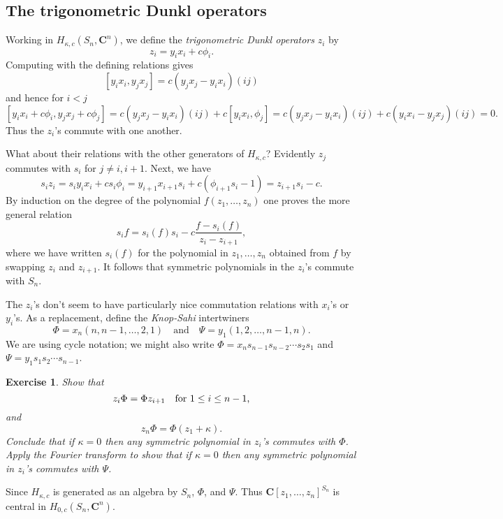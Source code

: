 \documentclass[12pt, reqno]{amsart}
\numberwithin{equation}{section}
\theoremstyle{definition}
\theoremstyle{plain}
\newtheorem{exercise}{Exercise}
\newcommand{\CC}{\mathbf{C}}
\begin{document}
 
\subsection{The trigonometric Dunkl operators} 

Working in $H_{\kappa,c}(S_n,\CC^n)$, we define the \emph{trigonometric Dunkl operators} $z_i$ by
$$z_i=y_i x_i+c \phi_i.$$ Computing with the defining relations gives
$$[y_i x_i,y_j x_j]=c(y_j x_j-y_i x_i) (ij)$$ and hence for $i<j$
$$[y_i x_i+c \phi_i,y_j x_j+c\phi_j]=c(y_j x_j-y_i x_i)(ij)+c[y_i x_i,\phi_j]=c(y_j x_j-y_i x_i)(ij)+c(y_i x_i-y_j x_j)(ij)=0.$$ Thus the $z_i$'s commute with one another. 

What about their relations with the other generators of $H_{\kappa,c}$? Evidently $z_j$ commutes with $s_i$ for $j \neq i,i+1$. Next, we have
$$s_i z_i=s_i y_i x_i+ c s_i \phi_i=y_{i+1} x_{i+1} s_i+c(\phi_{i+1}s_i-1)=z_{i+1} s_i-c.$$ By induction on the degree of the polynomial $f(z_1,\dots,z_n)$ one proves the more general relation
$$s_i f=s_i(f) s_i-c \frac{f-s_i(f)}{z_i-z_{i+1}},$$ where we have written $s_i(f)$ for the polynomial in $z_1,\dots,z_n$ obtained from $f$ by swapping $z_i$ and $z_{i+1}$. It follows that symmetric polynomials in the $z_i$'s commute with $S_n$. 

The $z_i$'s don't seem to have particularly nice commutation relations with $x_i$'s or $y_i$'s. As a replacement, define the \emph{Knop-Sahi} intertwiners $$\Phi=x_n (n,n-1,\dots,2,1) \quad \text{and} \quad \Psi=y_1 (1,2,\dots,n-1,n).$$ We are using cycle notation; we might also write $\Phi=x_n s_{n-1} s_{n-2} \cdots s_2 s_1$ and $\Psi=y_1 s_1 s_2 \cdots s_{n-1}$.
\begin{exercise}
Show that
$$z_i \Phi=\Phi z_{i+1} \quad \hbox{for $1 \leq i \leq n-1$,}$$ and
$$z_n \Phi=\Phi (z_1 +\kappa).$$	Conclude that if $\kappa=0$ then any symmetric polynomial in $z_i$'s commutes with $\Phi$. Apply the Fourier transform to show that if $\kappa=0$ then any symmetric polynomial in $z_i$'s commutes with $\Psi$.
\end{exercise}

Since $H_{\kappa,c}$ is generated as an algebra by $S_n$, $\Phi$, and $\Psi$. Thus $\CC[z_1,\dots,z_n]^{S_n}$ is central in $H_{0,c}(S_n,\CC^n)$.
\end{document}

